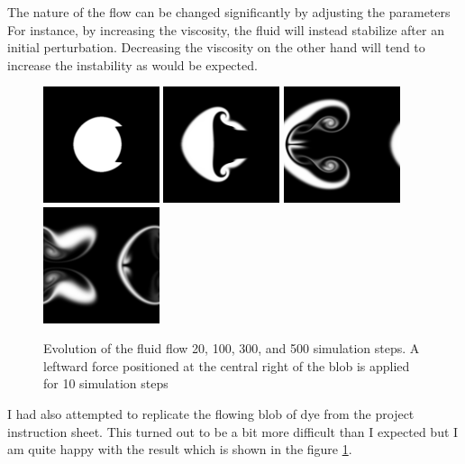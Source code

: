 \documentclass[12pt, letterpaper]{article}
\begin{document}
The nature of the flow can be changed significantly by adjusting the parameters
For instance, by increasing the viscosity, the fluid will instead stabilize after an initial perturbation.
Decreasing the viscosity on the other hand will tend to increase the instability as would be expected.

\begin{figure}[h!]
  \center
  \includegraphics[width=9.2em]{run/images/20_Steps.png}
  \includegraphics[width=9.2em]{run/images/100_Steps.png}
  \includegraphics[width=9.2em]{run/images/300_Steps.png}
  \includegraphics[width=9.2em]{run/images/500_Steps.png}
  \caption{Evolution of the fluid flow 20, 100, 300, and 500 simulation steps.
  A leftward force positioned at the central right of the blob is applied for 10 simulation steps}
  \label{result2}
\end{figure}
\pagebreak
I had also attempted to replicate the flowing blob of dye from the project instruction sheet.
This turned out to be a bit more difficult than I expected but I am quite happy with the result which is shown in the figure \ref{result2}.
\end{document}
